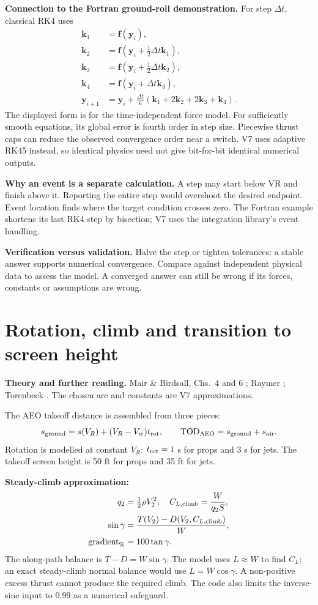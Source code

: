 \documentclass[11pt,letterpaper]{article}
\newcommand{\topic}[1]{\clearpage\section{#1}}
\newcommand{\reading}[1]{{\small\color{navy}\textbf{Theory and further reading.} #1\par}\vspace{3pt}}
\begin{document}
\textbf{Connection to the Fortran ground-roll demonstration.}
For step $\Delta t$, classical RK4 uses
\begin{align*}
\mathbf k_1&=\mathbf f(\mathbf y_i),\\
\mathbf k_2&=\mathbf f(\mathbf y_i+\tfrac12\Delta t\mathbf k_1),\\
\mathbf k_3&=\mathbf f(\mathbf y_i+\tfrac12\Delta t\mathbf k_2),\\
\mathbf k_4&=\mathbf f(\mathbf y_i+\Delta t\mathbf k_3),\\
\mathbf y_{i+1}&=\mathbf y_i+\frac{\Delta t}{6}
(\mathbf k_1+2\mathbf k_2+2\mathbf k_3+\mathbf k_4).
\end{align*}
The displayed form is for the time-independent force model. For sufficiently
smooth equations, its global error is fourth order in step size. Piecewise
thrust caps can reduce the observed convergence order near a switch.
V7 uses adaptive RK45 instead, so identical physics need not give bit-for-bit
identical numerical outputs.

\textbf{Why an event is a separate calculation.}
A step may start below VR and finish above it. Reporting the entire step would
overshoot the desired endpoint. Event location finds where the target condition
crosses zero. The Fortran example shortens its last RK4 step by bisection;
V7 uses the integration library's event handling.

\begin{keyidea}
\textbf{Verification versus validation.} Halve the step or tighten tolerances:
a stable answer supports numerical convergence. Compare against independent
physical data to assess the model. A converged answer can still be wrong if
its forces, constants or assumptions are wrong.
\end{keyidea}

\topic{Rotation, climb and transition to screen height}
\reading{Mair \& Birdsall, Chs.~4 and 6 \cite{mair}; Raymer \cite{raymer}; Torenbeek \cite{torenbeek}. The chosen arc and constants are V7 approximations.}
The AEO takeoff distance is assembled from three pieces:
\[
s_{\rm ground}=s(V_R)+(V_R-V_w)t_{\rm rot},\qquad
\mathrm{TOD}_{\rm AEO}=s_{\rm ground}+s_{\rm air}.
\]
Rotation is modelled at constant $V_R$: $t_{\rm rot}=1$ s for props and 3 s for jets.
The takeoff screen height is 50 ft for props and 35 ft for jets.

\textbf{Steady-climb approximation:}
\begin{align*}
q_2&=\tfrac12\rho V_2^2,\quad C_{L,\rm climb}=\frac{W}{q_2S},\\
\sin\gamma&=\frac{T(V_2)-D(V_2,C_{L,\rm climb})}{W},\\
\mathrm{gradient}_{\%}&=100\tan\gamma.
\end{align*}
The along-path balance is $T-D=W\sin\gamma$. The model uses $L\approx W$
to find $C_L$; an exact steady-climb normal balance would use $L=W\cos\gamma$.
A non-positive excess thrust cannot produce the required climb. The code also
limits the inverse-sine input to 0.99 as a numerical safeguard.
\end{document}
